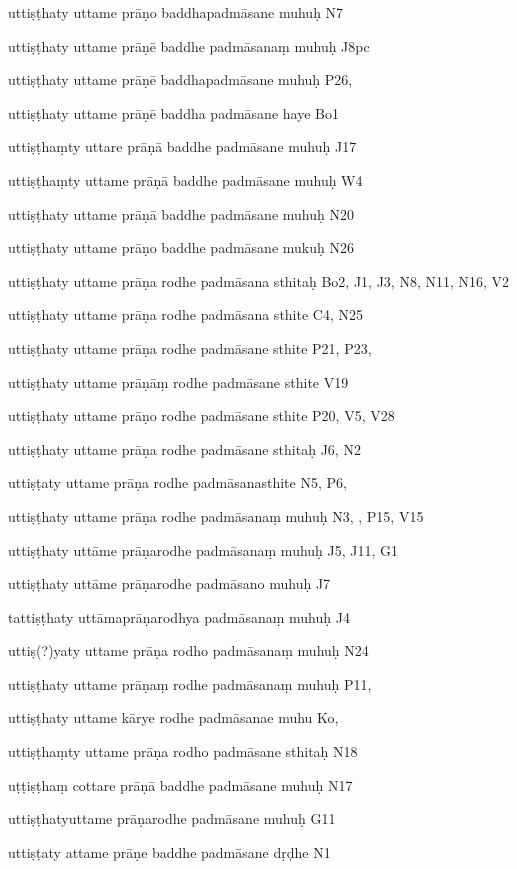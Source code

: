 \begin{ekdosis}
\begin{marma}[hp01_055]
\begin{marma}[hp02_009]
\begin{marma}[hp02_011]
\begin{marma}[hp02_012]
\item[uttiṣṭhaty uttame prāṇo baddhapadmāsane muhuḥ] N7
\item[uttiṣṭhaty uttame prāṇē baddhe padmāsanaṃ muhuḥ] J8pc
\item[uttiṣṭhaty uttame prāṇē baddhapadmāsane muhuḥ] P26, 
\item[uttiṣṭhaty uttame prāṇē baddha padmāsane haye] Bo1
\item[uttiṣṭhaṃty uttare prāṇā baddhe padmāsane muhuḥ] J17
\item[uttiṣṭhaṃty uttame prāṇā baddhe padmāsane muhuḥ] W4
\item[uttiṣṭhaty uttame prāṇā baddhe padmāsane muhuḥ] N20
\item[uttiṣṭhaty uttame prāṇo baddhe padmāsane mukuḥ] N26
\item[uttiṣṭhaty uttame prāṇa rodhe padmāsana sthitaḥ] Bo2, J1, J3, N8, N11, N16, V2
\item[uttiṣṭhaty uttame prāṇa rodhe padmāsana sthite] C4, N25
\item[uttiṣṭhaty uttame prāṇa rodhe padmāsane sthite] P21, P23, 
\item[uttiṣṭhaty uttame prāṇāṃ rodhe padmāsane sthite] V19
\item[uttiṣṭhaty uttame prāṇo rodhe padmāsane sthite] P20, V5, V28
\item[uttiṣṭhaty uttame prāṇa rodhe padmāsane sthitaḥ] J6, N2
\item[uttiṣṭaty uttame prāṇa rodhe padmāsanasthite]  N5, P6, 
\item[uttiṣṭhaty uttame prāṇa rodhe padmāsanaṃ muhuḥ] N3, , P15, V15
\item[uttiṣṭhaty uttāme prāṇarodhe padmāsanaṃ muhuḥ] J5, J11, G1
\item[uttiṣṭhaty uttāme prāṇarodhe padmāsano muhuḥ] J7
\item[tattiṣṭhaty uttāmaprāṇarodhya padmāsanaṃ muhuḥ] J4
\item[uttiṣ(?)yaty uttame prāṇa rodho padmāsanaṃ muhuḥ] N24
\item[uttiṣṭhaty uttame prāṇaṃ rodhe padmāsanaṃ muhuḥ] P11, 
\item[uttiṣṭhaty uttame kārye rodhe padmāsanae muhu] Ko,
\item[uttiṣṭhaṃty uttame prāṇa rodho padmāsane sthitaḥ] N18
\item[uṭṭiṣṭhaṃ cottare prāṇā baddhe padmāsane muhuḥ] N17
\item[uttiṣṭhatyuttame prāṇarodhe padmāsane muhuḥ] G11
\item[uttiṣṭaty attame prāṇe baddhe padmāsane dṛḍhe] N1

\end{marma}
\end{marma}
\end{marma}
\end{marma}
\end{ekdosis}
